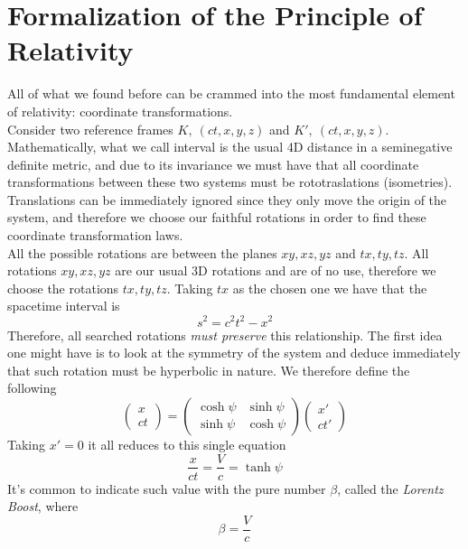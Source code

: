 \documentclass[../admech.tex]{subfiles}
\begin{document}
\section{Formalization of the Principle of Relativity}
All of what we found before can be crammed into the most fundamental element of relativity: coordinate transformations.\\
Consider two reference frames $K,\ (ct,x,y,z)$ and $K',\ (ct,x,y,z)$. Mathematically, what we call interval is the usual 4D distance in a seminegative definite metric, and due to its invariance we must have that all coordinate transformations between these two systems must be rototraslations (isometries). Translations can be immediately ignored since they only move the origin of the system, and therefore we choose our faithful rotations in order to find these coordinate transformation laws.\\
All the possible rotations are between the planes $xy,xz,yz$ and $tx,ty,tz$. All rotations $xy,xz,yz$ are our usual 3D rotations and are of no use, therefore we choose the rotations $tx,ty,tz$. Taking $tx$ as the chosen one we have that the spacetime interval is
\begin{equation*}
	s^2=c^2t^2-x^2
\end{equation*}
Therefore, all searched rotations \textit{must preserve} this relationship. The first idea one might have is to look at the symmetry of the system and deduce immediately that such rotation must be hyperbolic in nature. We therefore define the following
\begin{equation}
	\begin{pmatrix}x\\ct\end{pmatrix}=\begin{pmatrix}\cosh\psi&\sinh\psi\\\sinh\psi&\cosh\psi\end{pmatrix}\begin{pmatrix}x'\\ct'\end{pmatrix}
	\label{eq:hyprotm}
\end{equation}
Taking $x'=0$ it all reduces to this single equation
\begin{equation}
	\frac{x}{ct}=\frac{V}{c}=\tanh\psi
	\label{eq:ctransfhyp}
\end{equation}
It's common to indicate such value with the pure number $\beta$, called the \emph{Lorentz Boost}, where
\begin{equation*}
	\beta=\frac{V}{c}
\end{equation*}
\end{document}
